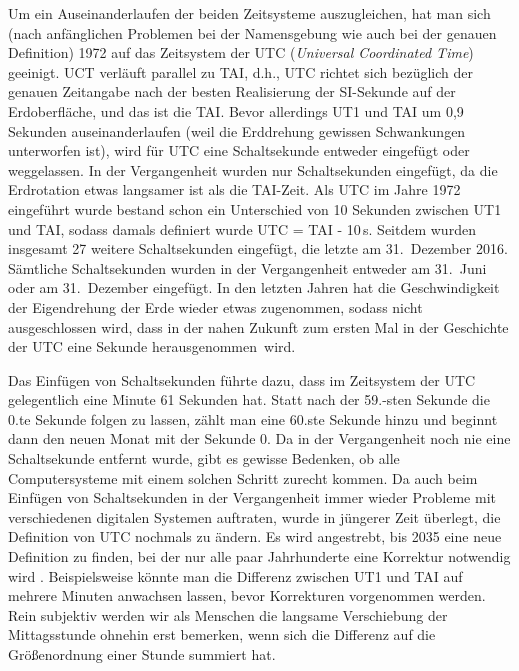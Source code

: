 Um ein Auseinanderlaufen der beiden Zeitsysteme auszugleichen, hat man sich (nach anf\"anglichen Problemen bei
der Namensgebung wie auch bei der genauen Definition) 1972 auf das Zeitsystem 
der UTC
(\textit{Universal Coordinated Time}) geeinigt. UCT verl\"auft parallel zu TAI, d.h., UTC richtet sich bez\"uglich
der genauen Zeitangabe nach der besten Realisierung der SI-Sekunde auf der Erdoberfl\"ache, und das ist
die TAI. Bevor allerdings UT1 und TAI um 0,9 Sekunden auseinanderlaufen (weil die Erddrehung gewissen
Schwankungen unterworfen ist), wird f\"ur UTC eine 
Schaltsekunde entweder eingef\"ugt oder weggelassen.
In der Vergangenheit wurden nur Schaltsekunden eingef\"ugt, da die Erdrotation etwas langsamer ist als
die TAI-Zeit. Als UTC im Jahre 1972 eingef\"uhrt wurde bestand schon ein Unterschied von 10 Sekunden
zwischen UT1 und TAI, sodass damals definiert wurde UTC = TAI - 10\,s. Seitdem wurden insgesamt 27
weitere Schaltsekunden eingef\"ugt, die letzte am 31.\ Dezember 2016. S\"amtliche Schaltsekunden wurden
in der Vergangenheit entweder am 31.\ Juni oder am 31.\ Dezember eingef\"ugt. In den letzten Jahren hat
die Geschwindigkeit der Eigendrehung der Erde wieder etwas zugenommen, sodass nicht ausgeschlossen
wird, dass in der nahen Zukunft zum ersten Mal in der Geschichte der UTC eine Sekunde \glqq herausgenommen\grqq\ wird. 

Das Einf\"ugen von Schaltsekunden f\"uhrte dazu, dass im Zeitsystem der UTC gelegentlich eine Minute
61 Sekunden hat. Statt nach der 59.-sten Sekunde die 0.te Sekunde folgen zu lassen, z\"ahlt man 
eine 60.ste Sekunde hinzu und beginnt dann den neuen Monat mit der Sekunde 0. Da in der Vergangenheit
noch nie eine Schaltsekunde entfernt wurde, gibt es gewisse Bedenken, ob alle Computersysteme mit einem
solchen Schritt zurecht kommen. Da auch beim Einf\"ugen von Schaltsekunden in der Vergangenheit immer
wieder Probleme mit verschiedenen digitalen Systemen auftraten, wurde in j\"ungerer Zeit \"uberlegt, die
Definition von UTC nochmals zu \"andern. Es wird angestrebt, bis 2035 eine neue Definition zu finden, bei
der nur alle paar Jahrhunderte eine Korrektur notwendig wird \cite{BIPM2022}. Beispielsweise k\"onnte man die Differenz
zwischen UT1 und TAI auf mehrere Minuten anwachsen lassen, bevor Korrekturen vorgenommen werden.
Rein subjektiv werden wir als Menschen die langsame Verschiebung der Mittagsstunde ohnehin erst
bemerken, wenn sich die Differenz auf die Gr\"o\ss enordnung einer Stunde summiert hat. 

